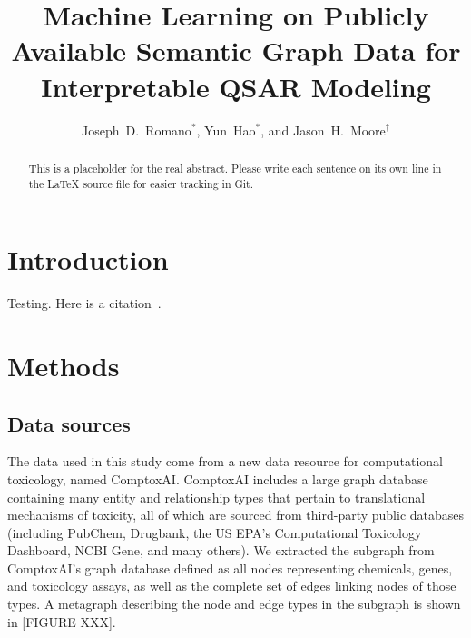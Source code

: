 \documentclass{ws-procs11x85}
\begin{document}
\title{Machine Learning on Publicly Available Semantic Graph Data for Interpretable QSAR Modeling}

\author{Joseph~D.~Romano$^*$, Yun~Hao$^*$, and Jason~H.~Moore$^\dag$}

\address{Institute for Biomedical Informatics, University of Pennsylvania,\\
Philadelphia, Pennsylvania 19104, United States\\
$^\dag$E-mail: jhmoore@upenn.edu\\
$^*$These authors contributed equally.}

\begin{abstract}
This is a placeholder for the real abstract.
Please write each sentence on its own line in the \LaTeX{} source file for easier tracking in Git.
\end{abstract}


\section{Introduction}\label{aba:sec1}
Testing.
Here is a citation~\cite{cherkasov2014qsar}.

\section{Methods}

\subsection{Data sources}
The data used in this study come from a new data resource for computational toxicology, named ComptoxAI.
ComptoxAI includes a large graph database containing many entity and relationship types that pertain to translational mechanisms of toxicity, all of which are sourced from third-party public databases (including PubChem, Drugbank, the US EPA's Computational Toxicology Dashboard, NCBI Gene, and many others).
We extracted the subgraph from ComptoxAI's graph database defined as all nodes representing chemicals, genes, and toxicology assays, as well as the complete set of edges linking nodes of those types.
A metagraph describing the node and edge types in the subgraph is shown in [FIGURE XXX].
\end{document}
